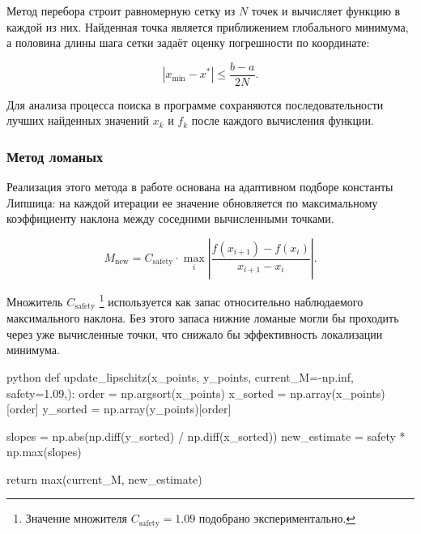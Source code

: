Метод перебора строит равномерную сетку из $N$ точек и вычисляет функцию в каждой
из них. Найденная точка является приближением глобального минимума, а половина
длины шага сетки задаёт оценку погрешности по координате:

\[
|x_{\min} - x^*| \leq \frac{b-a}{2N}.
\]

Для анализа процесса поиска в программе сохраняются последовательности лучших
найденных значений $x_k$ и $f_k$ после каждого вычисления функции.

\subsubsection{Метод ломаных}

Реализация этого метода в работе основана на адаптивном подборе константы Липшица:
на каждой итерации ее значение обновляется по максимальному коэффициенту наклона 
между соседними вычисленными точками.

\begin{equation}
M_{\mathrm{new}} = C_{\mathrm{safety}} \cdot \max_i
\left|
\frac{f(x_{i+1})-f(x_i)}{x_{i+1}-x_i}
\right|.
\end{equation}

Множитель $C_{\mathrm{safety}}$ \footnote{Значение множителя 
$C_{\mathrm{safety}} = 1.09$ подобрано
экспериментально.} используется как запас относительно
наблюдаемого максимального наклона.
Без этого запаса нижние ломаные могли бы проходить через уже вычисленные
точки, что снижало бы эффективность локализации минимума.

\begin{mintedbox}{python}
    def update_lipschitz(x_points, y_points, current_M=-np.inf, safety=1.09,):
        order = np.argsort(x_points)
        x_sorted = np.array(x_points)[order]
        y_sorted = np.array(y_points)[order]
        
        slopes = np.abs(np.diff(y_sorted) / np.diff(x_sorted))
        new_estimate = safety * np.max(slopes)

        return max(current_M, new_estimate)
\end{mintedbox}

\newpage

